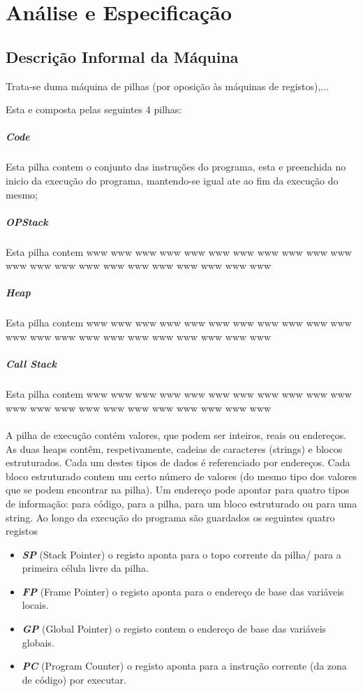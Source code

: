 \documentclass{report}
\begin{document}
\chapter{Análise e Especificação} \label{ae}
\section{Descrição Informal da Máquina}

\quad Trata-se duma máquina de pilhas (por oposição às máquinas de registos),...



Esta e composta pelas seguintes 4 pilhas:
\paragraph{\quad Code}
Esta pilha contem o conjunto das instruções do programa, esta e preenchida no inicio da execução do programa, mantendo-se igual
ate ao fim da execução do mesmo;
\paragraph{\quad OPStack}
Esta pilha contem www www www www www www www www www www www www www www www www www www www www www www
\paragraph{\quad Heap}
Esta pilha contem www www www www www www www www www www www www www www www www www www www www www www
\paragraph{\quad Call Stack}
Esta pilha contem www www www www www www www www www www www www www www www www www www www www www www
\\
\\
\quad A pilha de execução contém valores, que podem ser inteiros, reais ou endereços.
As duas heaps contêm, respetivamente, cadeias de caracteres (strings) e blocos estruturados.
Cada um destes tipos de dados é referenciado por endereços. Cada bloco
estruturado contem um certo número de valores (do mesmo tipo dos valores que se podem
encontrar na pilha).
Um endereço pode apontar para quatro tipos de informação: para código, para a
pilha, para um bloco estruturado ou para uma string.
Ao longo da execução do programa são guardados os seguintes quatro registos
\begin{itemize}
	\item \textit{\textbf{SP}} (Stack Pointer) o registo aponta para o topo corrente da pilha/ para a primeira célula livre da pilha.
	\item \textit{\textbf{FP}} (Frame Pointer) o registo aponta para o endereço de base das variáveis locais.
	\item \textit{\textbf{GP}} (Global Pointer) o registo contem o endereço de base das variáveis globais.
	\item \textit{\textbf{PC}} (Program Counter) o registo aponta para a instrução corrente (da zona de código) por executar.
\end{itemize}
\end{document}

